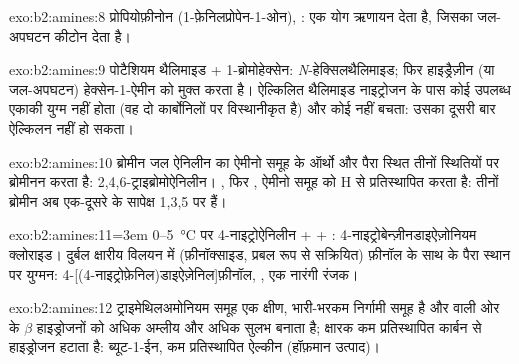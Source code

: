 \begin{solution}{exo:b2:amines:8}
प्रोपियोफ़ीनोन (1-फ़ेनिलप्रोपेन-1-ओन), : एक योग  ऋणायन देता है,
जिसका जल-अपघटन कीटोन देता है।
\end{solution}

\begin{solution}{exo:b2:amines:9}
पोटैशियम थैलिमाइड + 1-ब्रोमोहेक्सेन: \textit{N}-हेक्सिलथैलिमाइड; फिर हाइड्रैज़ीन (या जल-अपघटन)
हेक्सेन-1-ऐमीन को मुक्त करता है। ऐल्किलित थैलिमाइड नाइट्रोजन के पास कोई उपलब्ध एकाकी युग्म नहीं होता (वह
दो कार्बोनिलों पर विस्थानीकृत है) और कोई  नहीं बचता: उसका दूसरी बार ऐल्किलन नहीं हो सकता।
\end{solution}

\begin{solution}{exo:b2:amines:10}
ब्रोमीन जल ऐनिलीन का ऐमीनो समूह के ऑर्थो और पैरा स्थित तीनों स्थितियों पर ब्रोमीनन करता है:
2,4,6-ट्राइब्रोमोऐनिलीन। , फिर , ऐमीनो समूह को H से प्रतिस्थापित करता है: तीनों
ब्रोमीन अब एक-दूसरे के सापेक्ष 1,3,5 पर हैं।
\end{solution}

\begin{solution}{exo:b2:amines:11}\emergencystretch=3em
0--\qty{5}{\degreeCelsius} पर 4-नाइट्रोऐनिलीन +  + : 4-नाइट्रोबेन्ज़ीनडाइऐज़ोनियम
क्लोराइड। दुर्बल क्षारीय विलयन में (फ़ीनॉक्साइड, प्रबल रूप से सक्रियित) फ़ीनॉल के साथ
 के पैरा स्थान पर युग्मन: 4-[(4-नाइट्रोफ़ेनिल)डाइऐज़ेनिल]फ़ीनॉल, , एक नारंगी
रंजक।
\end{solution}

\begin{solution}{exo:b2:amines:12}
ट्राइमेथिलअमोनियम समूह एक क्षीण, भारी-भरकम निर्गामी समूह है और
 वाली ओर के $\beta$ हाइड्रोजनों को अधिक अम्लीय और अधिक सुलभ बनाता है; क्षारक कम
प्रतिस्थापित कार्बन से हाइड्रोजन हटाता है: ब्यूट-1-ईन, कम प्रतिस्थापित ऐल्कीन (हॉफ़मान उत्पाद)।
\end{solution}

